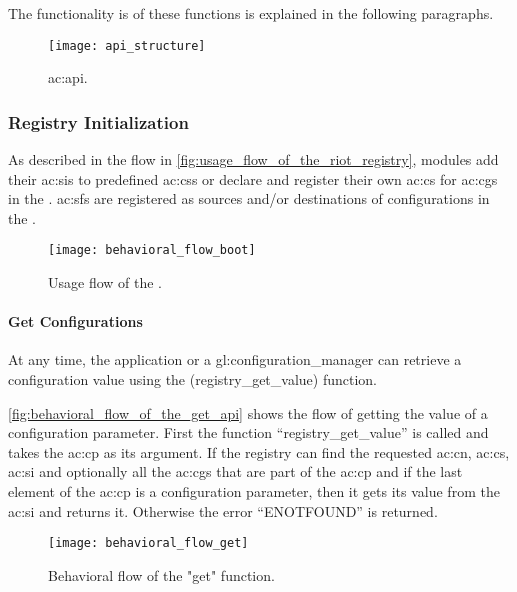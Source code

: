 The functionality is of these functions is explained in the following paragraphs.

\begin{figure}[H]
    \centering
    \texttt{[image: api\_structure]}
    \caption{ \gls{ac:api}.}
    \label{fig:riot_os_registry_api_structure}
\end{figure}

\subsubsection{Registry Initialization}

As described in the flow in \autoref{fig:usage_flow_of_the_riot_registry}, modules add their \glspl{ac:si} to predefined \glspl{ac:cs} or declare and register their own \gls{ac:cs} for \glspl{ac:cg} in the .
\glspl{ac:sf} are registered as sources and/or destinations of configurations in the .

\begin{figure}[H]
    \centering
    \texttt{[image: behavioral\_flow\_boot]}
    \caption{Usage flow of the .}
    \label{fig:usage_flow_of_the_riot_registry}
\end{figure}

\paragraph{Get Configurations}\mbox{}

At any time, the application or a \gls{gl:configuration_manager} can retrieve a configuration value using the (registry\_get\_value) function.

\autoref{fig:behavioral_flow_of_the_get_api} shows the flow of getting the value of a configuration parameter.
First the function ``registry\_get\_value'' is called and takes the \gls{ac:cp} as its argument.
If the registry can find the requested \gls{ac:cn}, \gls{ac:cs}, \gls{ac:si} and optionally all the \glspl{ac:cg} that are part of the \gls{ac:cp} and if the last element of the \gls{ac:cp} is a configuration parameter, then it gets its value from the \gls{ac:si} and returns it. Otherwise the error ``ENOTFOUND'' is returned.

\begin{figure}[H]
    \centering
    \texttt{[image: behavioral\_flow\_get]}
    \caption{Behavioral flow of the "get" function.}
    \label{fig:behavioral_flow_of_the_get_api}
\end{figure}

